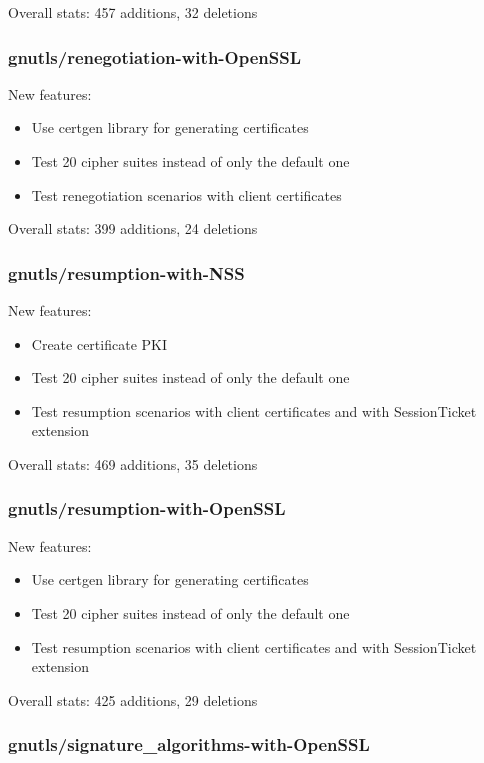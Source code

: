     \noindent Overall stats: 457 additions, 32 deletions

\subsubsection{gnutls/renegotiation-with-OpenSSL}
    New features:
    \begin{itemize}
        \item Use certgen library for generating certificates
        \item Test 20 cipher suites instead of only the default one
        \item Test renegotiation scenarios with client certificates
    \end{itemize}

    \noindent Overall stats: 399 additions, 24 deletions

\subsubsection{gnutls/resumption-with-NSS}
    New features:
    \begin{itemize}
        \item Create certificate PKI
        \item Test 20 cipher suites instead of only the default one
        \item Test resumption scenarios with client certificates and with
            SessionTicket extension
    \end{itemize}

    \noindent Overall stats: 469 additions, 35 deletions

\subsubsection{gnutls/resumption-with-OpenSSL}
    New features:
    \begin{itemize}
        \item Use certgen library for generating certificates
        \item Test 20 cipher suites instead of only the default one
        \item Test resumption scenarios with client certificates and with
            SessionTicket extension
    \end{itemize}

    \noindent Overall stats: 425 additions, 29 deletions

\subsubsection{gnutls/signature\_algorithms-with-OpenSSL}

